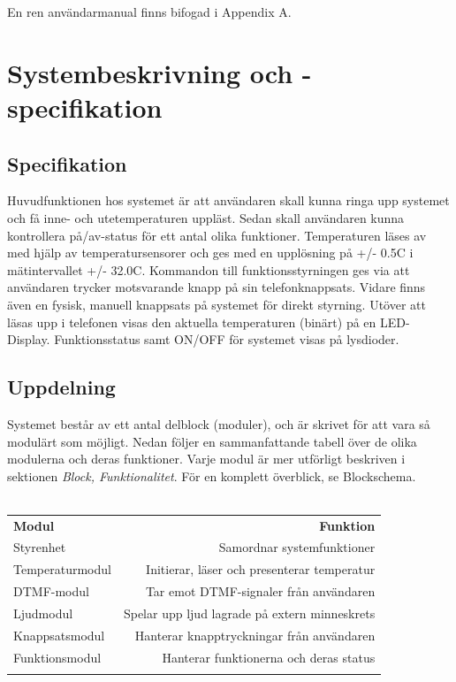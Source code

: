 \documentclass[a4paper,11pt]{article}
\begin{document}
	En ren användarmanual finns bifogad i Appendix A.

\pagebreak

\section{Systembeskrivning och -specifikation}

	\subsection{Specifikation}

	Huvudfunktionen hos systemet är att användaren skall kunna ringa upp systemet och få inne- och utetemperaturen
	uppläst. Sedan skall användaren kunna kontrollera på/av-status för ett antal olika funktioner. Temperaturen
	läses av med hjälp av temperatursensorer och ges med en upplösning på +/- 0.5C i mätintervallet +/- 32.0C.
	Kommandon till funktionsstyrningen ges via att användaren trycker motsvarande knapp på sin telefonknappsats.
	Vidare finns även en fysisk, manuell knappsats på systemet för direkt styrning. Utöver att läsas upp i 
	telefonen visas den aktuella temperaturen (binärt) på en LED-Display. Funktionsstatus samt ON/OFF för systemet
	visas på lysdioder.

	\subsection{Uppdelning}

	Systemet består av ett antal delblock (moduler), och är skrivet för att vara så modulärt som möjligt.
	Nedan följer en sammanfattande tabell över de olika modulerna och deras funktioner. Varje modul är mer
	utförligt beskriven i sektionen {\it Block, Funktionalitet}. För en komplett överblick, se Blockschema. \\\\

	\begin{tabular}{l r}
		{\bf Modul} & {\bf Funktion}\\
	   	Styrenhet & Samordnar systemfunktioner\\
	  	Temperaturmodul & Initierar, läser och presenterar temperatur\\
	   	DTMF-modul & Tar emot DTMF-signaler från användaren\\
		Ljudmodul & Spelar upp ljud lagrade på extern minneskrets\\
		Knappsatsmodul & Hanterar knapptryckningar från användaren\\
		Funktionsmodul & Hanterar funktionerna och deras status\\\\
	\end{tabular}
\end{document}
